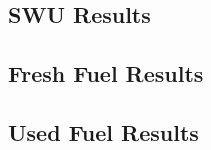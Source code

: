 \subsection{SWU Results}






\subsection{Fresh Fuel Results}





\subsection{Used Fuel Results}



